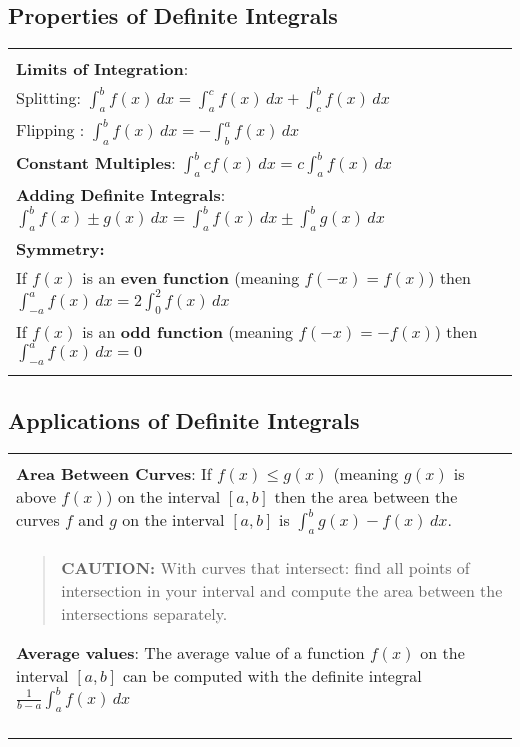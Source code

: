 \documentclass[12pt]{report}
\newenvironment{boxe}
    {\begin{center}
    \begin{tabular}{|p{0.9\textwidth}|}
    \hline\\
    }
    { 
    \\\\\hline
    \end{tabular} 
    \end{center}
    }
\begin{document}
\subsection*{Properties of Definite Integrals}
\begin{boxe}
\textbf{Limits of Integration}:\\ Splitting: $\displaystyle{\int_{a}^{b}f(x)\,dx=\int_{a}^{c}f(x)\,dx+\int_{c}^{b}f(x)\,dx}$\\
Flipping : $\displaystyle{\int_{a}^{b}f(x)\,dx=-\int_{b}^{a}f(x)\,dx}$\\
\textbf{Constant Multiples}: $\displaystyle{\int_{a}^{b}cf(x)\,dx=c\int_{a}^{b}f(x)\,dx}$\\
\textbf{Adding Definite Integrals}: $\displaystyle{\int_{a}^{b}f(x)\pm g(x)\,dx=\int_{a}^{b}f(x)\,dx\pm \int_{a}^{b}g(x)\,dx}$\\
\textbf{Symmetry:}\\ 
If $f(x)$ is an \textbf{even function} (meaning $f(-x)=f(x)$) then $\displaystyle{\int_{-a}^{a}f(x)\,dx=2\int_{0}^{2}f(x)\,dx}$\\
If $f(x)$ is an \textbf{odd function} (meaning $f(-x)=-f(x)$) then $\displaystyle{\int_{-a}^{a}f(x)\,dx=0}$
\end{boxe}
\subsection*{Applications of Definite Integrals}
\begin{boxe}
\textbf{Area Between Curves}: If $f(x)\leq g(x)$ (meaning $g(x)$ is above $f(x)$) on the interval $[a,b]$ then the area between the curves $f$ and $g$ on the interval $[a,b]$ is $\displaystyle{\int_{a}^{b}g(x)-f(x)\,dx}$.\\
\begin{quote}
\vspace{-.25in}
    \textbf{CAUTION:} With curves that intersect: find all points of intersection in your interval and compute the area between the intersections separately.
\end{quote}

    \iffalse To the right is a visual example of the area enclosed by the curves $f(x)$ and $g(x)$ and the area \\
    \begin{wrapfigure}{r}{0.20\textwidth}
    \centering
    \texttt{[image: areabetweencurve.png]}
    \end{wrapfigure}
    \fi

\textbf{Average values}: The average value of a function $f(x)$ on the interval $[a,b]$ can be computed with the definite integral $\displaystyle{\frac{1}{b-a}\int_{a}^{b}f(x)\,dx}$
\end{boxe}
\end{document}
